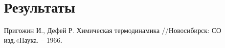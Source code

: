 \documentclass[12pt]{article}
\begin{document}
\section{Результаты}

\begin{thebibliography}{9}
     Пригожин И., Дефей Р. Химическая термодинамика //Новосибирск: СО изд.«Наука. – 1966.
\end{thebibliography}
\end{document}
